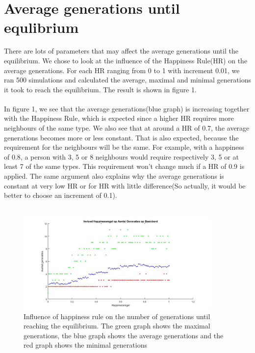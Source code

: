 \documentclass{article}
\begin{document}
\section{Average generations until equlibrium}
There are lots of parameters that may affect the average generations until the equilibrium. We chose to look at the influence of the Happiness Rule(HR) on the average generations. For each HR ranging from 0 to 1 with increment 0.01, we ran 500 simulations and calculated the average, maximal and minimal generations it took to reach the equilibrium. The result is shown in figure 1.\\
\\
In figure 1, we see that the average generations(blue graph) is increasing together with the Happiness Rule, which is expected since a higher HR requires more neighbours of the same type. We also see that at around a HR of 0.7, the average generations becomes more or less constant. That is also expected, because the requirement for the neighbours will be the same. For example, with a happiness of 0.8, a person with 3, 5 or 8 neighbours would require respectively 3, 5 or at least 7 of the same types. This requirement won't change much if a HR of 0.9 is applied. The same argument also explains why the average generations is constant at very low HR or for HR with little difference(So actually, it would be better to choose an increment of 0.1).\\
\\
\begin{figure}[h!]
    \centering
    \includegraphics[width=0.9\textwidth]{happinessregel_aantgen_2}
    \caption{Influence of happiness rule on the number of generations until reaching the equilibrium. The green graph shows the maximal generations, the blue graph shows the average generations and the red graph shows the minimal generations}
\end{figure}
\\
\end{document}
